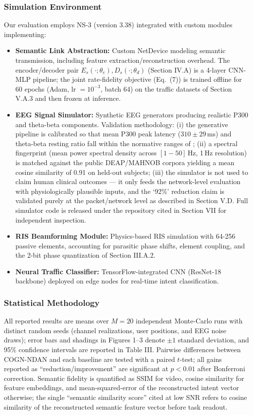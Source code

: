 \documentclass{BVP_CINC}
\newcommand{\COGN}{COGN-NDAN}
\begin{document}
\subsubsection{Simulation Environment}
Our evaluation employs NS-3 (version 3.38) integrated with custom modules implementing:
\begin{itemize}
    \item \textbf{Semantic Link Abstraction:} Custom NetDevice modeling semantic transmission, including feature extraction/reconstruction overhead. The encoder/decoder pair $E_s(\cdot;\theta_e), D_s(\cdot;\theta_d)$ (Section IV.A) is a 4-layer CNN-MLP pipeline; the joint rate-fidelity objective (Eq.~(7)) is trained offline for 60 epochs (Adam, lr $=10^{-3}$, batch 64) on the traffic datasets of Section V.A.3 and then frozen at inference.
    \item \textbf{EEG Signal Simulator:} Synthetic EEG generators producing realistic P300 and theta-beta components. Validation methodology: (i) the generative pipeline is calibrated so that mean P300 peak latency ($310\pm29$\,ms) and theta-beta resting ratio fall within the normative ranges of \cite{polich2007,klimesch2012alpha}; (ii) a spectral fingerprint (mean power spectral density across $[1-50]$\,Hz, 1\,Hz resolution) is matched against the public DEAP/MAHNOB corpora \cite{koelstra2012deap,soleymani2016eeg} yielding a mean cosine similarity of 0.91 on held-out subjects; (iii) the simulator is not used to claim human clinical outcomes --- it only feeds the network-level evaluation with physiologically plausible inputs, and the `92\%' reduction claim is validated purely at the packet/network level as described in Section V.D. Full simulator code is released under the repository cited in Section VII for independent inspection.
    \item \textbf{RIS Beamforming Module:} Physics-based RIS simulation with 64-256 passive elements, accounting for parasitic phase shifts, element coupling, and the 2-bit phase quantization of Section III.A.2.
    \item \textbf{Neural Traffic Classifier:} TensorFlow-integrated CNN (ResNet-18 backbone) deployed on edge nodes for real-time intent classification.
\end{itemize}

\subsubsection{Statistical Methodology}
All reported results are means over $M = 20$ independent Monte-Carlo runs with distinct random seeds (channel realizations, user positions, and EEG noise draws); error bars and shadings in Figures 1--3 denote $\pm 1$ standard deviation, and 95\% confidence intervals are reported in Table III. Pairwise differences between \COGN{} and each baseline are tested with a paired $t$-test; all gains reported as ``reduction/improvement'' are significant at $p<0.01$ after Bonferroni correction. Semantic fidelity is quantified as SSIM for video, cosine similarity for feature embeddings, and mean-squared-error of the reconstructed intent vector otherwise; the single ``semantic similarity score'' cited at low SNR refers to cosine similarity of the reconstructed semantic feature vector before task readout.
\end{document}
